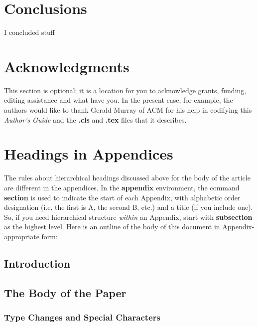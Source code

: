 \documentclass{sig-alternate}
\begin{document}
\section{Conclusions}
I concluded stuff

\section{Acknowledgments}
This section is optional; it is a location for you
to acknowledge grants, funding, editing assistance and
what have you.  In the present case, for example, the
authors would like to thank Gerald Murray of ACM for
his help in codifying this \textit{Author's Guide}
and the \textbf{.cls} and \textbf{.tex} files that it describes.

%

%
%
\appendix
\section{Headings in Appendices}
The rules about hierarchical headings discussed above for
the body of the article are different in the appendices.
In the \textbf{appendix} environment, the command
\textbf{section} is used to
indicate the start of each Appendix, with alphabetic order
designation (i.e. the first is A, the second B, etc.) and
a title (if you include one).  So, if you need
hierarchical structure
\textit{within} an Appendix, start with \textbf{subsection} as the
highest level. Here is an outline of the body of this
document in Appendix-appropriate form:
\subsection{Introduction}
\subsection{The Body of the Paper}
\subsubsection{Type Changes and  Special Characters}
\end{document}
